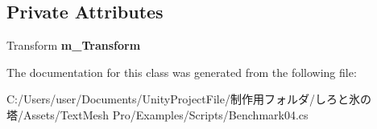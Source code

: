 \subsection*{Private Attributes}
\begin{DoxyCompactItemize}
\item 
\mbox{\label{class_t_m_pro_1_1_examples_1_1_benchmark04_ab02a4920ec975bc74fc79bfba5a8b10f}} 
Transform {\bfseries m\+\_\+\+Transform}
\end{DoxyCompactItemize}


The documentation for this class was generated from the following file\+:\begin{DoxyCompactItemize}
\item 
C\+:/\+Users/user/\+Documents/\+Unity\+Project\+File/制作用フォルダ/しろと氷の塔/\+Assets/\+Text\+Mesh Pro/\+Examples/\+Scripts/Benchmark04.\+cs\end{DoxyCompactItemize}
